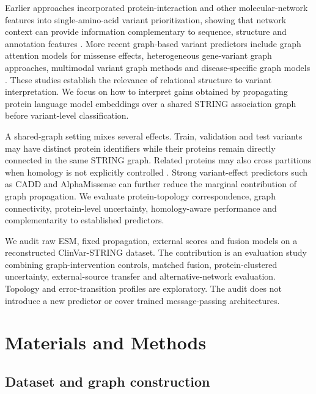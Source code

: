 \documentclass[conference]{IEEEtran}
\begin{document}
Earlier approaches incorporated protein-interaction and other molecular-network features into single-amino-acid variant prioritization, showing that network context can provide information complementary to sequence, structure and annotation features \cite{Yates2014SuSPect,Ozturk2022NetworkFeatures}. More recent graph-based variant predictors include graph attention models for missense effects, heterogeneous gene-variant graph approaches, multimodal variant graph methods and disease-specific graph models \cite{Zhang2022gMVP,Cheng2021VEGN,Yu2025GNNMAP,Ghadie2025DiseaseSpecificGNN}. These studies establish the relevance of relational structure to variant interpretation. We focus on how to interpret gains obtained by propagating protein language model embeddings over a shared STRING association graph before variant-level classification.

A shared-graph setting mixes several effects. Train, validation and test variants may have distinct protein identifiers while their proteins remain directly connected in the same STRING graph. Related proteins may also cross partitions when homology is not explicitly controlled \cite{Littmann2022ProteinMLTips,Teufel2023GraphPart}. Strong variant-effect predictors such as CADD and AlphaMissense can further reduce the marginal contribution of graph propagation. We evaluate protein-topology correspondence, graph connectivity, protein-level uncertainty, homology-aware performance and complementarity to established predictors.

We audit raw ESM, fixed propagation, external scores and fusion models on a reconstructed ClinVar-STRING dataset. The contribution is an evaluation study combining graph-intervention controls, matched fusion, protein-clustered uncertainty, external-source transfer and alternative-network evaluation. Topology and error-transition profiles are exploratory. The audit does not introduce a new predictor or cover trained message-passing architectures.

\section{Materials and Methods}

\subsection{Dataset and graph construction}
\end{document}
